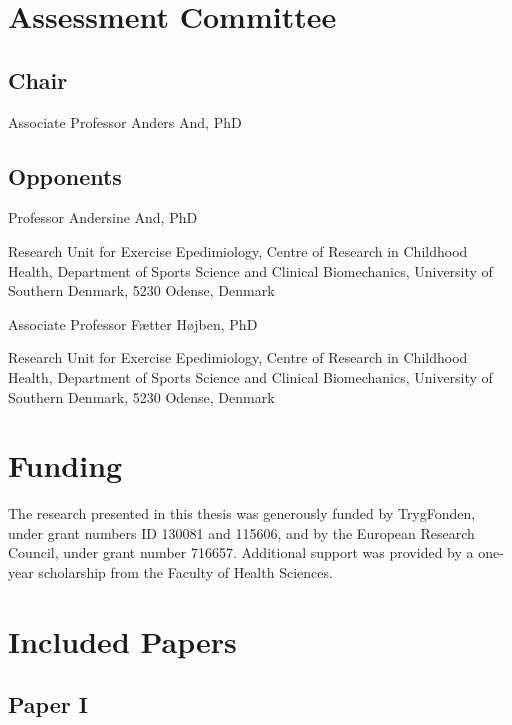 \documentclass[
  10pt,
  letterpaper,
  DIV=11,
  numbers=noendperiod]{scrartcl}
\begin{document}
\hypertarget{assessment-committee}{%
\section{Assessment Committee}\label{assessment-committee}}

\hypertarget{chair}{%
\subsection{Chair}\label{chair}}

Associate Professor Anders And, PhD

\hypertarget{opponents}{%
\subsection{Opponents}\label{opponents}}

Professor Andersine And, PhD

Research Unit for Exercise Epedimiology, Centre of Research in Childhood
Health, Department of Sports Science and Clinical Biomechanics,
University of Southern Denmark, 5230 Odense, Denmark

Associate Professor Fætter Højben, PhD

Research Unit for Exercise Epedimiology, Centre of Research in Childhood
Health, Department of Sports Science and Clinical Biomechanics,
University of Southern Denmark, 5230 Odense, Denmark

\hypertarget{funding}{%
\section{Funding}\label{funding}}

The research presented in this thesis was generously funded by
TrygFonden, under grant numbers ID 130081 and 115606, and by the
European Research Council, under grant number 716657. Additional support
was provided by a one-year scholarship from the Faculty of Health
Sciences.

\newpage

\hypertarget{included-papers}{%
\section{Included Papers}\label{included-papers}}

\hypertarget{paper-i}{%
\subsection{Paper I}\label{paper-i}}
\end{document}
